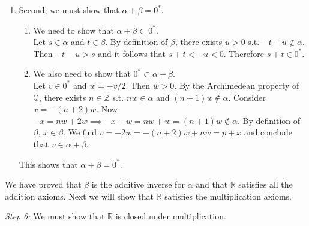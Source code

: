 \documentclass[../main.tex]{subfiles}
\begin{document}
\begin{enumerate}
    \item Second, we must show that \( \alpha + \beta = 0^* \).
    \begin{enumerate}[label=\roman*.]
        \item We need to show that \( \alpha + \beta \subset 0^* \). \\
        Let \( s \in \alpha \) and \( t \in \beta \). By definition of \( \beta \), there exists \( u > 0 \) s.t. \( -t-u \notin \alpha \).
        Then \( -t-u > s \) and it follows that \( s + t < -u < 0 \). Therefore \( s+t \in 0^* \).
        \item We also need to show that \( 0^* \subset \alpha + \beta \). \\
        Let \( v \in 0^* \) and \( w = -v/2 \). Then \( w > 0 \).
        By the Archimedean property of \( \mathbb{Q} \), there exists \( n \in \mathbb{Z} \) s.t. \( nw \in \alpha \) and \( (n+1)w \notin \alpha \).
        Consider \( x = -(n+2)w \). Now \( -x = nw+2w \implies -x-w = nw+w = (n+1)w \notin \alpha \). By definition of \( \beta \), \( x \in \beta \).
        We find \( v = -2w = -(n+2)w + nw = p + x \) and conclude that \( v \in \alpha + \beta \).
    \end{enumerate}
    This shows that \( \alpha + \beta = 0^* \).
\end{enumerate}
We have proved that \( \beta \) is the additive inverse for \( \alpha \) and that \( \mathbb{R} \) satisfies all the addition axioms.
Next we will show that \( \mathbb{R} \) satisfies the multiplication axioms.

\emph{Step 6:} We must show that \( \mathbb{R} \) is closed under multiplication.
\end{document}
